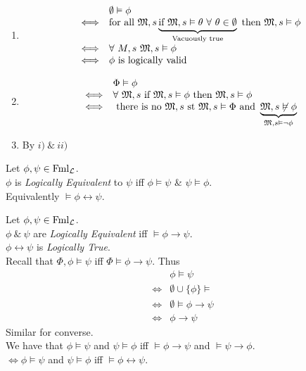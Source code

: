 \documentclass[11pt,a4paper]{article}
\begin{document}
\begin{enumerate}
	\item \[\begin{array}{rl}
	&\emptyset\vDash\phi\\
	\Longleftrightarrow&\text{for all }\mathfrak{M},s\underbrace{\text{if }\mathfrak{M},s\vDash\theta\ \forall\ \theta\in\emptyset}_{\text{Vacuously true}}\text{ then }\mathfrak{M},s\vDash\phi\\
	\Longleftrightarrow&\forall\ M,s\ \mathfrak{M},s\vDash\phi\\
	\Longleftrightarrow&\phi\text{ is logically valid}\\
	\end{array}\]
	\item \[\begin{array}{rl}
	&\Phi\vDash\phi\\
	\Longleftrightarrow&\forall\ \mathfrak{M},s\text{ if }\mathfrak{M},s\vDash\phi\text{ then }\mathfrak{M},s\vDash\phi\\
	\Longleftrightarrow&\text{ there is no }\mathfrak{M},s\text{ st }\mathfrak{M},s\vDash\Phi\text{ and }\underbrace{\mathfrak{M},s\not\vDash\phi}_{\mathfrak{M},s\vDash\neg\phi}
	\end{array}\]
	\item By $i)\ \&\ ii)$
\end{enumerate}

Let $\phi,\psi\in\text{Fml}_{\mathcal{L}}$.\\
$\phi$ is \textit{Logically Equivalent} to $\psi$ iff $\phi\vDash\psi$ \& $\psi\vDash\phi$.\\
\nb Equivalently $\vDash\phi\leftrightarrow\psi$.

Let $\phi,\psi\in\text{Fml}_{\mathcal{L}}$.\\
$\phi\ \&\ \psi$ are \textit{Logically Equivalent} iff $\vDash\phi\to\psi$.\\
\ie $\phi\leftrightarrow\psi$ is \textit{Logically True}.\\

Recall that $\Phi,\phi\vDash\psi$ iff $\Phi\vDash\phi\to\psi$. Thus
\[\begin{array}{rl}
&\phi\vDash\psi\\
\Longleftrightarrow&\emptyset\cup\{\phi\}\vDash\\
\Longleftrightarrow&\emptyset\vDash\phi\to\psi\\
\Longleftrightarrow&\phi\to\psi
\end{array}\]
Similar for converse.\\
We have that $\phi\vDash\psi$ and $\psi\vDash\phi$ iff $\vDash\phi\to\psi$ and $\vDash\psi\to\phi$.\\
$\Longleftrightarrow\phi\vDash\psi$ and $\psi\vDash\phi$ iff $\vDash\phi\leftrightarrow\psi$.\\
\end{document}
